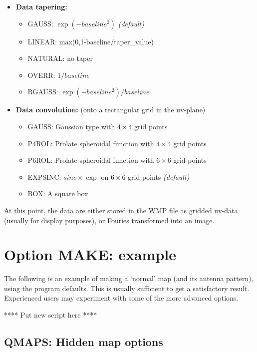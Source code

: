 \begin{itemize}
\item {\bf Data tapering:}
  \begin{itemize}
  \item {  GAUSS:}      $\exp(-baseline^{2})$
  {\it (default)}
  \item {  LINEAR:}     max(0,1-baseline/taper\_value)
  \item {  NATURAL:}    no taper
  \item {  OVERR:}      $1/baseline$
  \item {  RGAUSS:}     $\exp(-baseline^{2})/baseline$
  \end{itemize}

\item {\bf Data convolution:} (onto a rectangular grid in the uv-plane)
  \begin{itemize}
  \item {  GAUSS:}      Gaussian type with $4\times 4$ grid points
  \item {  P4ROL:}      Prolate spheroidal function with $4\times 4$ grid points
  \item {  P6ROL:}      Prolate spheroidal function with $6\times 6$ grid points
  \item {  EXPSINC:}    $sinc\times\exp$ on $6\times 6$ grid points
  {\it (default)}
  \item {  BOX:}        A square box
  \end{itemize}
\end{itemize}

At this point, the data are either stored in the WMP file as gridded uv-data
(usually for display purposes), or Fouries transformed into an image.


\section{Option MAKE: example}
\label{.make.example}

The following is an example of making a `normal' map (and its antenna pattern),
using the program defaults. This is usually sufficient to get a satisfactory
result. Experienced users may experiment with some of the more advanced
options.

**** Put new script here ****



\subsection{QMAPS: Hidden map options}
\label{.make.qmaps}

